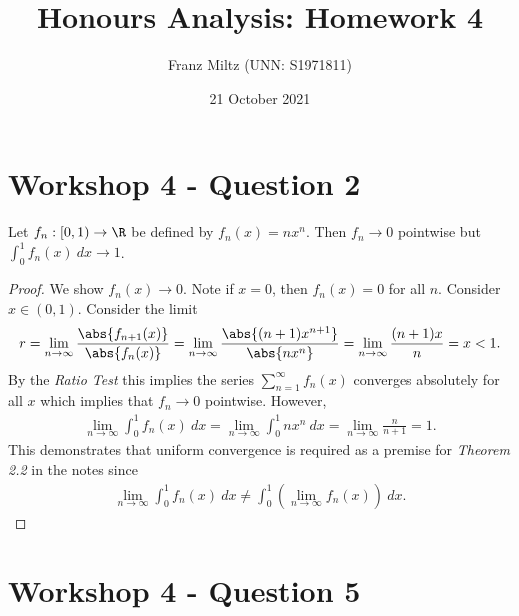\documentclass{article}
\begin{document}
\title{Honours Analysis: Homework 4}
\author{Franz Miltz (UNN: S1971811)}
\date{21 October 2021}
\maketitle

\section*{Workshop 4 - Question 2}

\begin{claim*}
   Let $f_n:\left[0,1\right)\to\R$ be defined by $f_n(x)=nx^n$.
   Then $f_n\to 0$ pointwise but $\int_0^1 f_n(x)\:dx\to 1$. 
\end{claim*}

\begin{proof}
   We show $f_n(x)\to 0$.
   Note if $x=0$, then $f_n(x)=0$ for all $n$. Consider $x\in(0,1)$.
   Consider the limit 
   \begin{align*}
      r = \lim_{n\to\infty} \frac{\abs{f_{n+1}(x)}}{\abs{f_n(x)}}
      = \lim_{n\to\infty}\frac{\abs{(n+1)x^{n+1}}}{\abs{nx^n}}
      = \lim_{n\to\infty}\frac{(n+1)x}{n} = x < 1.
   \end{align*}
   By the \emph{Ratio Test} this implies the series $\sum_{n=1}^\infty 
   f_n(x)$ converges absolutely for all $x$ which implies that
   $f_n\to 0$ pointwise. However,
   \begin{align*}
      \lim_{n\to\infty} \int_0^1 f_n(x)\:dx 
      = \lim_{n\to\infty}\int_0^1 nx^n\:dx
      = \lim_{n\to\infty}\frac{n}{n+1} = 1.
   \end{align*}
   This demonstrates that uniform convergence is required as a premise for 
   \emph{Theorem 2.2} in the notes since
   \begin{align*}
      \lim_{n\to\infty} \int_0^1 f_n(x)\:dx  
      \not = \int_0^1\left(\lim_{n\to\infty} f_n(x)\right)\:dx.
   \end{align*}
\end{proof}

\section*{Workshop 4 - Question 5}
\end{document}
